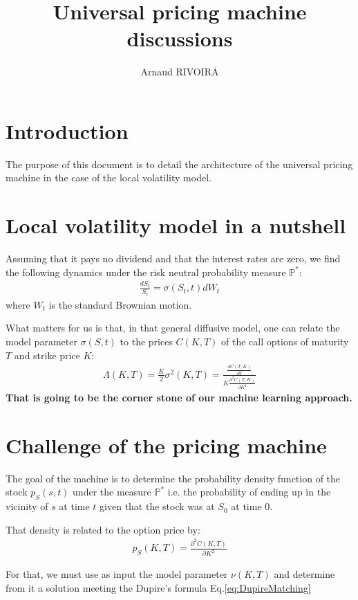 \documentclass[10pt,a4paper]{article}
\author{Arnaud RIVOIRA}
\title{Universal pricing machine discussions}
\begin{document}
\maketitle
\section{Introduction}
The purpose of this document is to detail the architecture of the universal pricing machine in the case of the local volatility model.

\section{Local volatility model in a nutshell}
Assuming that it pays no dividend and that the interest rates are zero, we find the following dynamics under the risk neutral probability measure $\mathbb{P}^*$:
\begin{align}\label{eq:BlackScholes}
\frac{dS_t}{S_t} = \sigma(S_t,t) dW_t
\end{align}
where $W_t$ is the standard Brownian motion.

What matters for us is that, in that general diffusive model, one can relate the model parameter $\sigma(S,t)$ to the prices $C(K,T)$ of the call options of maturity $T$ and strike price $K$:
\begin{align}\label{eq:DupireMatching}
\Lambda(K,T) = \frac{K}{2}\sigma^2(K,T) = \frac{\frac{\partial C(T,K)}{\partial T}}{K\frac{\partial^2 C(T,K)}{\partial K^2}}
\end{align}
\textbf{That is going to be the corner stone of our machine learning approach.}

\section{Challenge of the pricing machine}
The goal of the machine is to determine the probability density function of the stock $p_S(s,t)$ under the measure $\mathbb{P}^*$ i.e. the probability of ending up in the vicinity of $s$ at time $t$ given that the stock was at $S_0$ at time 0.

That density is related to the option price by:
\begin{align}
p_S(K,T) = \frac{\partial^2 C(K,T)}{\partial K^2}
\end{align}

For that, we must use as input the model parameter $\nu(K,T)$ and determine from it a solution meeting the Dupire's formula Eq.\ref{eq:DupireMatching}
\end{document}
